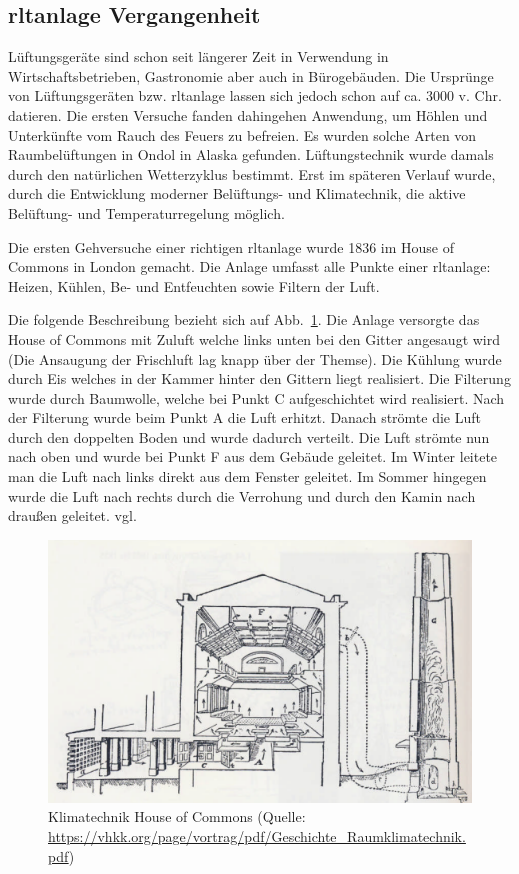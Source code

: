 \subsection{\ac{rltanlage} Vergangenheit}
Lüftungsgeräte sind schon seit längerer Zeit in Verwendung \zB in Wirtschaftsbetrieben, Gastronomie aber auch in Bürogebäuden. Die Ursprünge von Lüftungsgeräten bzw. \ac{rltanlage} lassen sich jedoch schon auf ca. 3000 v. Chr. datieren.
Die ersten Versuche fanden dahingehen Anwendung, um Höhlen und Unterkünfte vom Rauch des Feuers zu befreien. Es wurden solche Arten von Raumbelüftungen \zB in Ondol in Alaska gefunden.
Lüftungstechnik wurde damals durch den natürlichen Wetterzyklus bestimmt. 
Erst im späteren Verlauf wurde, durch die Entwicklung moderner Belüftungs- und Klimatechnik, die aktive Belüftung- und Temperaturregelung möglich.

Die ersten Gehversuche einer richtigen \acs{rltanlage} wurde 1836 im House of Commons in London gemacht. Die Anlage umfasst alle Punkte einer \acs{rltanlage}: Heizen, Kühlen, Be- und Entfeuchten sowie Filtern der Luft. 

Die folgende Beschreibung bezieht sich auf
Abb.~\ref{fig:House_of_Commons_Klimatechnik}.
Die Anlage versorgte das House of Commons mit Zuluft welche links unten bei den Gitter angesaugt wird (Die Ansaugung der Frischluft lag knapp über der Themse). Die Kühlung wurde durch Eis welches in der Kammer hinter den Gittern liegt realisiert.
Die Filterung wurde durch Baumwolle, welche bei Punkt C aufgeschichtet wird realisiert.
Nach der Filterung wurde beim Punkt A die Luft erhitzt. 
Danach strömte die Luft durch den doppelten Boden und wurde dadurch verteilt. Die Luft strömte nun nach oben und wurde bei Punkt F aus dem Gebäude geleitet. Im Winter leitete man die Luft nach links direkt aus dem Fenster geleitet. Im Sommer hingegen wurde die Luft nach rechts durch die Verrohung und durch den Kamin  nach draußen geleitet. vgl.
\cite{Fitzner_Finke:2010} 

\begin{figure}[ht]
	\centering
	\includegraphics[width=0.6\linewidth]{Bilder/Belueftung_House_of_Commons}
	\caption{Klimatechnik House of Commons  (Quelle: \url{https://vhkk.org/page/vortrag/pdf/Geschichte_Raumklimatechnik.pdf})}
	\label{fig:House_of_Commons_Klimatechnik}
\end{figure}



